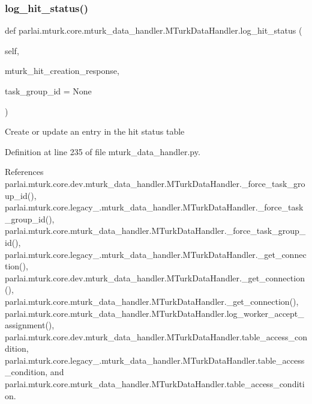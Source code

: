 \subsubsection{\texorpdfstring{log\+\_\+hit\+\_\+status()}{log\_hit\_status()}}
{\footnotesize\ttfamily def parlai.\+mturk.\+core.\+mturk\+\_\+data\+\_\+handler.\+M\+Turk\+Data\+Handler.\+log\+\_\+hit\+\_\+status (\begin{DoxyParamCaption}\item[{}]{self,  }\item[{}]{mturk\+\_\+hit\+\_\+creation\+\_\+response,  }\item[{}]{task\+\_\+group\+\_\+id = {\ttfamily None} }\end{DoxyParamCaption})}

\begin{DoxyVerb}Create or update an entry in the hit status table\end{DoxyVerb}
 

Definition at line 235 of file mturk\+\_\+data\+\_\+handler.\+py.



References parlai.\+mturk.\+core.\+dev.\+mturk\+\_\+data\+\_\+handler.\+M\+Turk\+Data\+Handler.\+\_\+force\+\_\+task\+\_\+group\+\_\+id(), parlai.\+mturk.\+core.\+legacy\+\_.\+mturk\+\_\+data\+\_\+handler.\+M\+Turk\+Data\+Handler.\+\_\+force\+\_\+task\+\_\+group\+\_\+id(), parlai.\+mturk.\+core.\+mturk\+\_\+data\+\_\+handler.\+M\+Turk\+Data\+Handler.\+\_\+force\+\_\+task\+\_\+group\+\_\+id(), parlai.\+mturk.\+core.\+legacy\+\_.\+mturk\+\_\+data\+\_\+handler.\+M\+Turk\+Data\+Handler.\+\_\+get\+\_\+connection(), parlai.\+mturk.\+core.\+dev.\+mturk\+\_\+data\+\_\+handler.\+M\+Turk\+Data\+Handler.\+\_\+get\+\_\+connection(), parlai.\+mturk.\+core.\+mturk\+\_\+data\+\_\+handler.\+M\+Turk\+Data\+Handler.\+\_\+get\+\_\+connection(), parlai.\+mturk.\+core.\+mturk\+\_\+data\+\_\+handler.\+M\+Turk\+Data\+Handler.\+log\+\_\+worker\+\_\+accept\+\_\+assignment(), parlai.\+mturk.\+core.\+dev.\+mturk\+\_\+data\+\_\+handler.\+M\+Turk\+Data\+Handler.\+table\+\_\+access\+\_\+condition, parlai.\+mturk.\+core.\+legacy\+\_.\+mturk\+\_\+data\+\_\+handler.\+M\+Turk\+Data\+Handler.\+table\+\_\+access\+\_\+condition, and parlai.\+mturk.\+core.\+mturk\+\_\+data\+\_\+handler.\+M\+Turk\+Data\+Handler.\+table\+\_\+access\+\_\+condition.

